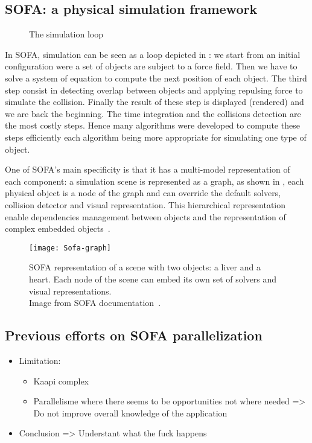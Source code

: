\subsection{SOFA: a physical simulation framework}

\begin{figure}[htb]
    \centering
    
    \caption[The simulation loop]{The simulation loop}
    \label{fig:simu-pipeline}
\end{figure}

In \gls{SOFA}, simulation can be seen as a loop depicted in : we start from an initial configuration were a set of objects are subject to a force field.
Then we have to solve a system of equation to compute the next position of each object.
The third step consist in detecting overlap between objects and applying repulsing force to simulate the collision.
Finally the result of these step is displayed (rendered) and we are back the beginning.
The time integration and the collisions detection are the most costly steps.
Hence many algorithms  were developed to compute these steps efficiently each algorithm being more appropriate for simulating one type of object.

One of \gls{SOFA}'s main specificity is that it has a multi-model representation of each component: a simulation scene is represented as a graph, as shown in , each physical object is a node of the graph and can override the default solvers, collision detector and visual representation.
This hierarchical representation enable dependencies management between objects and the representation of complex embedded objects~\cite{Nesme09Preserving,Faure11Sparse}.

\begin{figure}[htb]
    \centering
    \texttt{[image: Sofa-graph]}
    \caption[Example of SOFA scene graph]{SOFA representation of a scene with two objects: a liver and a
        heart. Each node of the scene can embed its own set of solvers and
        visual representations.\\
        Image from SOFA documentation~\cite{SOFA16Sofa}.}
    \label{fig:sofa-tree}
\end{figure}

\subsection{Previous efforts on SOFA parallelization}

\begin{itemize}
    \item Limitation:
        \begin{itemize}
            \item Kaapi complex
            \item Parallelisme where there seems to be opportunities not where needed => Do not improve overall knowledge of the application
        \end{itemize}
    \item Conclusion => Understant what the fuck happens
\end{itemize}

